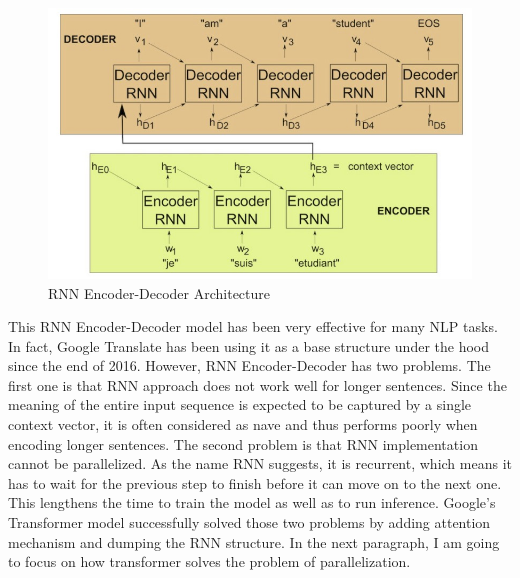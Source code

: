 \documentclass[conference]{IEEEtran}
\begin{document}
	\begin{figure}[!htbp]
		\centering
		\includegraphics[scale=0.3]{figures/figure6.png}
		\caption{\label{fig:my-label} RNN Encoder-Decoder Architecture \cite{transformer}}
	\end{figure}
	
	This RNN Encoder-Decoder model has been very effective for many NLP tasks. In fact, Google Translate has been using it as a base structure under the hood since the end of 2016\cite{google-translate}. However, RNN Encoder-Decoder has two problems. The first one is that RNN approach does not work well for longer sentences. Since the meaning of the entire input sequence is expected to be captured by a single context vector, it is often considered as nave and thus performs poorly when encoding longer sentences. The second problem is that RNN implementation cannot be parallelized. As the name RNN suggests, it is recurrent, which means it has to wait for the previous step to finish before it can move on to the next one. This lengthens the time to train the model as well as to run inference. Google's Transformer model successfully solved those two problems by adding attention mechanism and dumping the RNN structure. In the next paragraph, I am going to focus on how transformer solves the problem of parallelization.\\
	
\end{document}
